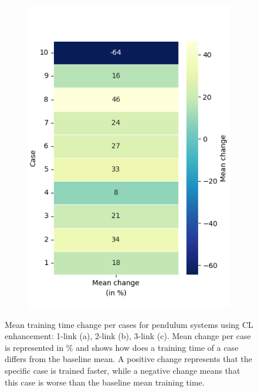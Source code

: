 \begin{figure}[h!]
\begin{subfigure}[t]{0.48\textwidth}
		\includegraphics[width=\textwidth]{Figures/TP_mean_heatmap_percentage.png}
		\label{fig: TP_mean}
		\caption{}
	\end{subfigure}
	\hfill
	
	\caption{Mean training time change per cases for pendulum systems using CL enhancement: 1-link (a), 2-link (b), 3-link (c). Mean change per case is represented in \% and shows how does a training time of a case differs from the baseline mean. A positive change represents that the specific case is trained faster, while a negative change means that this case is worse than the baseline mean training time.}
	\label{fig: percentage heatmaps for 1- to 3- link systems using CL}
\end{figure}

